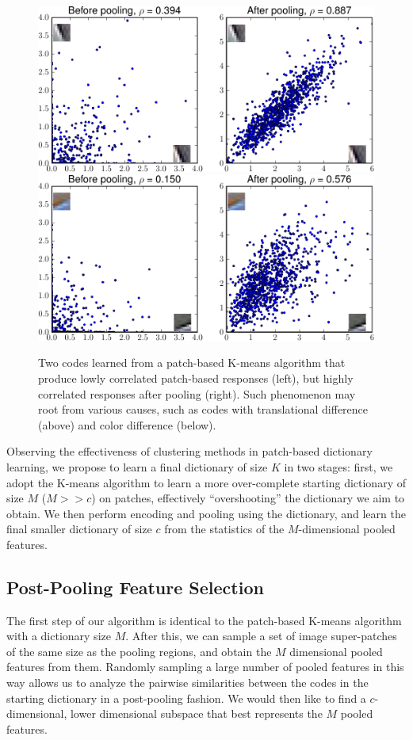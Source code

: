 \begin{figure}
    \centering
    \includegraphics[width=0.7\linewidth]{figs/sizematters/distribution/12_distribution_final.pdf}\\
    \includegraphics[width=0.7\linewidth]{figs/sizematters/distribution/34_distribution_final.pdf}
    \caption{Two codes learned from a patch-based K-means algorithm that produce lowly correlated patch-based responses (left), but highly correlated responses after pooling (right). Such phenomenon may root from various causes, such as codes with translational difference (above) and color difference (below).}\label{fig:feature_correlation}
\end{figure}

Observing the effectiveness of clustering methods in patch-based dictionary learning, we propose to learn a final dictionary of size $K$ in two stages: first, we adopt the K-means algorithm to learn a more over-complete starting dictionary of size $M$ ($M >> c$) on patches, effectively ``overshooting'' the dictionary we aim to obtain. We then perform encoding and pooling using the dictionary, and learn the final smaller dictionary of size $c$ from the statistics of the $M$-dimensional pooled features.

\subsection{Post-Pooling Feature Selection}
The first step of our algorithm is identical to the patch-based K-means algorithm with a dictionary size $M$. After this, we can sample a set of image super-patches of the same size as the pooling regions, and obtain the $M$ dimensional pooled features from them. Randomly sampling a large number of pooled features in this way allows us to analyze the pairwise similarities between the codes in the starting dictionary in a post-pooling fashion. We would then like to find a $c$-dimensional, lower dimensional subspace that best represents the $M$ pooled features.


